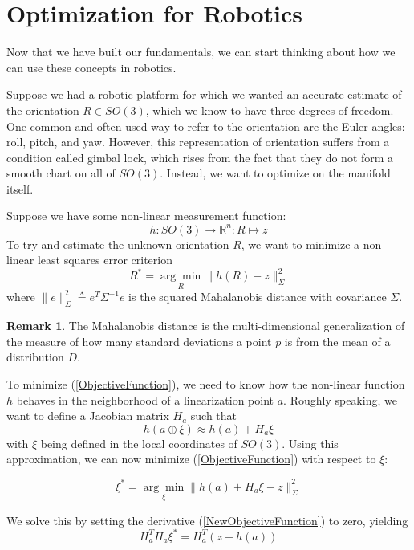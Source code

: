 \documentclass[reqno]{amsart}
\theoremstyle{definition}
\newtheorem{rem}{Remark}[section]
\numberwithin{equation}{section}
\begin{document}
\section{Optimization for Robotics}

Now that we have built our fundamentals, we can start thinking about how we can use these concepts in robotics.

Suppose we had a robotic platform for which we wanted an accurate estimate of the orientation $R \in SO(3)$, which we know to have three degrees of freedom. One common and often used way to refer to the orientation are the Euler angles: roll, pitch, and yaw. However, this representation of orientation suffers from a condition called gimbal lock, which rises from the fact that they do not form a smooth chart on all of $SO(3)$. Instead, we want to optimize on the manifold itself.

Suppose we have some non-linear measurement function:
\[h: SO(3) \to \mathbb{R}^n : R \mapsto z\]
To try and estimate the unknown orientation $R$, we want to minimize a non-linear least squares error criterion
\begin{equation}\label{ObjectiveFunction}
R^* = \underset{R}{\arg\min}\|h(R) - z\|_\Sigma^2
\end{equation}
where $\|e\|_\Sigma^2 \triangleq e^T\Sigma^{-1}e$ is the squared Mahalanobis distance with covariance $\Sigma$. 

\begin{rem}
    The Mahalanobis distance is the multi-dimensional generalization of the measure of how many standard deviations a point $p$ is from the mean of a distribution $D$.
\end{rem}

To minimize (\ref{ObjectiveFunction}), we need to know how the non-linear function $h$ behaves in the neighborhood of a linearization point $a$. Roughly speaking, we want to define a Jacobian matrix $H_a$ such that
\begin{equation}
    h(a \oplus \xi) \approx h(a) + H_a\xi
\end{equation}
with $\xi$ being defined in the local coordinates of $SO(3)$. Using this approximation, we can now minimize (\ref{ObjectiveFunction}) with respect to $\xi$:

\begin{equation}\label{NewObjectiveFunction}
    \xi^* = \underset{\xi}{\arg\min}\|h(a) + H_a\xi - z\|_\Sigma^2
\end{equation}

We solve this by setting the derivative (\ref{NewObjectiveFunction}) to zero, yielding
\begin{equation*}
    H_a^TH_a\xi^* = H_a^T(z - h(a))
\end{equation*}
\end{document}
